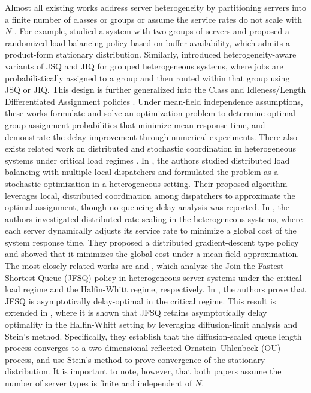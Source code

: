 \documentclass[11pt,oneside,letter]{article}
\begin{document}
Almost all existing works address server heterogeneity by partitioning servers into a finite number of classes or groups \cite{VanCom_21, GarJalWic_21, AbuDorGar_22,BhaMuk_22,AbuDorGar_24,BhaBukMuk_25} or assume the service rates do not scale with $N$ \cite{LuoZub_25}. For example, \cite{VanCom_21} studied a system with two groups of servers and proposed a randomized load balancing policy based on buffer availability, which admits a product-form stationary distribution. Similarly, \cite{GarJalWic_21} introduced heterogeneity-aware variants of JSQ and JIQ for grouped heterogeneous systems, where jobs are probabilistically assigned to a group and then routed within that group using JSQ or JIQ. This design is further generalized into the Class and Idleness/Length Differentiated Assignment policies \cite{AbuDorGar_22, AbuDorGar_24}. Under mean-field independence assumptions, these works formulate and solve an optimization problem to determine optimal group-assignment probabilities that minimize mean response time, and demonstrate the  delay improvement through numerical experiments. There also exists related work on distributed and stochastic coordination in heterogeneous systems under critical load regimes \cite{GorVarMos_21, DaaMarDeb_25}. In \cite{GorVarMos_21}, the authors studied distributed load balancing with multiple local dispatchers and formulated the problem as a stochastic optimization in a heterogeneous setting. Their proposed algorithm leverages local, distributed coordination among dispatchers to approximate the optimal assignment, though no queueing delay analysis was reported. In \cite{DaaMarDeb_25}, the authors investigated distributed rate scaling in the heterogeneous systems, where each server dynamically adjusts its service rate to minimize a global cost of the system response time. They proposed a distributed gradient-descent type policy and showed that it minimizes the global cost under a mean-field approximation. 
The most closely related works are \cite{BhaMuk_22} and \cite{BhaBukMuk_25}, which analyze the Join-the-Fastest-Shortest-Queue (JFSQ) policy in heterogeneous-server systems under the critical load regime and the Halfin-Whitt regime, respectively. In \cite{BhaMuk_22}, the authors prove that JFSQ is asymptotically delay-optimal in the critical regime. This result is extended in \cite{BhaBukMuk_25}, where it is shown that JFSQ retains asymptotically delay optimality in the Halfin-Whitt setting by leveraging diffusion-limit analysis and Stein's method. Specifically, they establish that the diffusion-scaled queue length process converges to a two-dimensional reflected Ornstein–Uhlenbeck (OU) process, and use Stein’s method to prove convergence of the stationary distribution. It is important to note, however, that both papers assume the number of server types is finite and independent of $N.$ 
\end{document}
